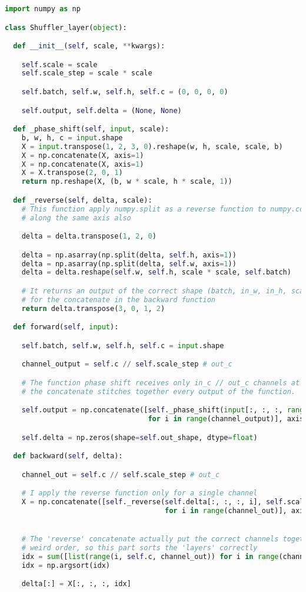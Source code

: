 \documentclass{standalone}
\begin{document}
\lstset{style=snippet}
\begin{lstlisting}[language=Python, caption=NumPyNet version of Pixel-Shuffle function, label=code:py_shuffle]
import numpy as np

class Shuffler_layer(object):

  def __init__(self, scale, **kwargs):

    self.scale = scale
    self.scale_step = scale * scale

    self.batch, self.w, self.h, self.c = (0, 0, 0, 0)

    self.output, self.delta = (None, None)

  def _phase_shift(self, input, scale):
    b, w, h, c = input.shape
    X = input.transpose(1, 2, 3, 0).reshape(w, h, scale, scale, b)
    X = np.concatenate(X, axis=1)
    X = np.concatenate(X, axis=1)
    X = X.transpose(2, 0, 1)
    return np.reshape(X, (b, w * scale, h * scale, 1))

  def _reverse(self, delta, scale):
    # This function apply numpy.split as a reverse function to numpy.concatenate
    # along the same axis also

    delta = delta.transpose(1, 2, 0)

    delta = np.asarray(np.split(delta, self.h, axis=1))
    delta = np.asarray(np.split(delta, self.w, axis=1))
    delta = delta.reshape(self.w, self.h, scale * scale, self.batch)

    # It returns an output of the correct shape (batch, in_w, in_h, scale**2)
    # for the concatenate in the backward function
    return delta.transpose(3, 0, 1, 2)

  def forward(self, input):

    self.batch, self.w, self.h, self.c = input.shape

    channel_output = self.c // self.scale_step # out_c

    # The function phase shift receives only in_c // out_c channels at a time
    # the concatenate stitches together every output of the function.

    self.output = np.concatenate([self._phase_shift(input[:, :, :, range(i, self.c, channel_output)], self.scale)
                                  for i in range(channel_output)], axis=3)

    self.delta = np.zeros(shape=self.out_shape, dtype=float)

  def backward(self, delta):

    channel_out = self.c // self.scale_step # out_c

    # I apply the reverse function only for a single channel
    X = np.concatenate([self._reverse(self.delta[:, :, :, i], self.scale)
                                      for i in range(channel_out)], axis=3)


    # The 'reverse' concatenate actually put the correct channels together but in a
    # weird order, so this part sorts the 'layers' correctly
    idx = sum([list(range(i, self.c, channel_out)) for i in range(channel_out)], [])
    idx = np.argsort(idx)

    delta[:] = X[:, :, :, idx]

\end{lstlisting}
\end{document}
